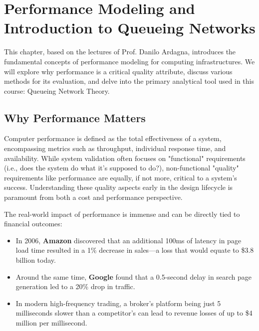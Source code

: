 \chapter{Performance Modeling and Introduction to Queueing Networks}

This chapter, based on the lectures of Prof. Danilo Ardagna, introduces the fundamental concepts of performance modeling for computing infrastructures. We will explore why performance is a critical quality attribute, discuss various methods for its evaluation, and delve into the primary analytical tool used in this course: Queueing Network Theory.

\section{Why Performance Matters}

Computer performance is defined as the total effectiveness of a system, encompassing metrics such as throughput, individual response time, and availability. While system validation often focuses on "functional" requirements (i.e., does the system do what it's supposed to do?), non-functional "quality" requirements like performance are equally, if not more, critical to a system's success. Understanding these quality aspects early in the design lifecycle is paramount from both a cost and performance perspective.

The real-world impact of performance is immense and can be directly tied to financial outcomes:
\begin{itemize}
    \item In 2006, \textbf{Amazon} discovered that an additional 100ms of latency in page load time resulted in a 1\% decrease in sales—a loss that would equate to \$3.8 billion today.
    \item Around the same time, \textbf{Google} found that a 0.5-second delay in search page generation led to a 20\% drop in traffic.
    \item In modern high-frequency trading, a broker's platform being just 5 milliseconds slower than a competitor's can lead to revenue losses of up to \$4 million per millisecond.
\end{itemize}

